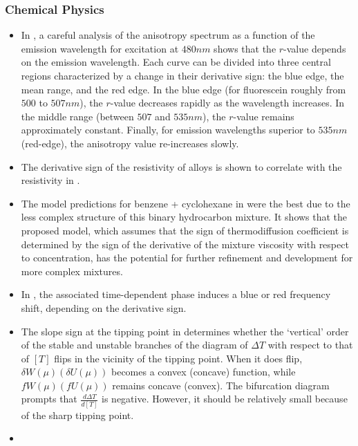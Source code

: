\documentclass[11pt]{book}
\begin{document}
\subsubsection{Chemical Physics}
\label{chemical_physics_subsubsection}
\begin{itemize}
\item In \cite{martini2010gold},
a careful analysis of the anisotropy spectrum as a function of the
emission wavelength for excitation at $480nm$ shows that the $r$-value
depends on the emission wavelength. Each curve can be divided into
three central regions characterized by a change in their derivative
sign: the blue edge, the mean range, and the red edge. In the blue
edge (for fluorescein roughly from $500$ to $507nm$), the $r$-value
decreases rapidly as the wavelength increases. In the middle range
(between $507$ and $535nm$), the $r$-value remains approximately
constant. Finally, for emission wavelengths superior to $535nm$ (red-edge),
the anisotropy value re-increases slowly.
\item The derivative sign of the resistivity of alloys is shown to correlate
with the resistivity in \cite{gantmakher2011mooij}.
\item The model predictions for benzene + cyclohexane in \cite{eslamian2012thermodiffusion}
were the best due to the less complex structure of this binary hydrocarbon
mixture. It shows that the proposed model, which assumes that the
sign of thermodiffusion coefficient is determined by the sign of the
derivative of the mixture viscosity with respect to concentration,
has the potential for further refinement and development for more
complex mixtures.
\item In \cite{batignani2015energy},
the associated time-dependent phase induces a blue or red frequency
shift, depending on the derivative sign.
\item The slope sign at the tipping point in \cite{bodai2015global}
determines whether the \textquoteleft vertical\textquoteright{} order
of the stable and unstable branches of the diagram of $\Delta T$
with respect to that of $\left[T\right]$ flips in the vicinity of
the tipping point. When it does flip, $\delta W\left(\mu\right)\left(\delta U\left(\mu\right)\right)$
becomes a convex (concave) function, while $fW\left(\mu\right)\left(fU\left(\mu\right)\right)$
remains concave (convex). The bifurcation diagram prompts that $\frac{d\Delta T}{d[T]}$
is negative. However, it should be relatively small because of the
sharp tipping point.
\item \cite{cina2016ultrafast}

\end{itemize}
\end{document}
